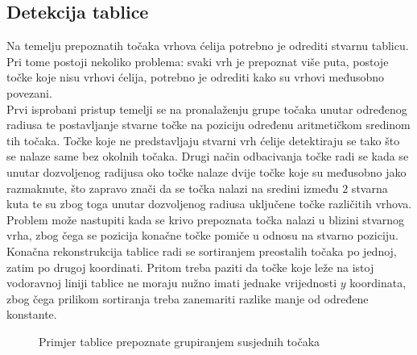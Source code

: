 \documentclass[times, utf8, zavrsni, numeric]{fer}
\begin{document}
\subsection{Detekcija tablice}
Na temelju prepoznatih točaka vrhova ćelija potrebno je odrediti stvarnu tablicu.
Pri tome postoji nekoliko problema: svaki vrh je prepoznat više puta, postoje točke koje nisu vrhovi ćelija, potrebno je odrediti kako su vrhovi međusobno povezani.\\

Prvi isprobani pristup temelji se na pronalaženju grupe točaka unutar određenog radiusa te postavljanje stvarne točke na poziciju određenu aritmetičkom sredinom tih točaka.
Točke koje ne predstavljaju stvarni vrh ćelije detektiraju se tako što se nalaze same bez okolnih točaka.
Drugi način odbacivanja točke radi se kada se unutar dozvoljenog radijusa oko točke nalaze dvije točke koje su međusobno jako razmaknute, što zapravo znači da se točka nalazi na sredini između $2$ stvarna kuta te su zbog toga unutar dozvoljenog radiusa uključene točke različitih vrhova.
Problem može nastupiti kada se krivo prepoznata točka nalazi u blizini stvarnog vrha, zbog čega se pozicija konačne točke pomiče u odnosu na stvarno poziciju.\\

Konačna rekonstrukcija tablice radi se sortiranjem preostalih točaka po jednoj, zatim po drugoj koordinati.
Pritom treba paziti da točke koje leže na istoj vodoravnoj liniji tablice ne moraju nužno imati jednake vrijednosti $y$ koordinata, zbog čega prilikom sortiranja treba zanemariti razlike manje od određene konstante.

\begin{figure}[!ht]
    \centering
    \captionsetup{justification=centering}
    \caption{Primjer tablice prepoznate grupiranjem susjednih točaka}
    \label{fig:tableV1}
\end{figure}
\end{document}
